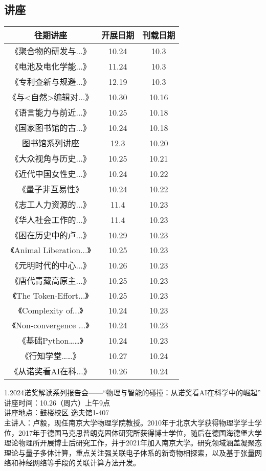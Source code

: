 \documentclass[letterpaper, 12pt]{article}
\begin{document}
\begin{multicols}{2}

\section{讲座}
\begin{tabular}{|c|c|c|}
    \hline
    往期讲座 & 开展日期 & 刊载日期\\
    \hline\hline
    《聚合物的研发与...》 & 10.24 & 10.3\\
    《电池及电化学能...》 & 11.24 & 10.3\\
    《专利查新与规避...》 & 12.19 & 10.3\\
    《与<自然>编辑对...》 & 10.30 & 10.16\\
    《语言能力与前近...》 & 10.25 & 10.18\\
    《国家图书馆的古...》 & 10.24 & 10.18\\
    图书馆系列讲座 & 12.3 & 10.20\\
    《大众视角与历史...》 & 10.25 & 10.21\\
    《近代中国女性史...》 & 10.24 & 10.22\\
    《量子非互易性》 & 10.24 & 10.22\\
    《志工人力资源的...》 & 11.4 & 10.23\\
    《华人社会工作的...》 & 11.4 & 10.23\\
    《困在历史中的卢...》 & 10.29 & 10.23\\
    《Animal Liberation...》 & 10.25 & 10.23\\
    《元明时代的中心...》 & 10.26 & 10.23\\
    《唐代青藏高原主...》 & 10.25 & 10.23\\
    《The Token-Effort...》 & 10.25 & 10.23\\
    《Complexity of...》 & 10.24 & 10.23\\
    《Non-convergence ...》 & 10.24 & 10.23\\
    《基础Python……》 & 10.24 & 10.23\\
    《行知学堂……》 & 10.27 & 10.24\\
    《从诺奖看AI在科...》 & 10.26 & 10.24\\

    
    \hline
\end{tabular}

1.2024诺奖解读系列报告会——“物理与智能的碰撞：从诺奖看AI在科学中的崛起”\\
讲座时间：10.26（周六）上午9点\\
讲座地点：鼓楼校区 逸夫馆1-407\\
主讲人：卢毅，现任南京大学物理学院教授。2010年于北京大学获得物理学学士学位，2017年于德国马克思普朗克固体研究所获得博士学位，随后在德国海德堡大学理论物理所开展博士后研究工作，并于2021年加入南京大学。研究领域涵盖凝聚态理论与量子多体计算，重点关注强关联电子体系的新奇物相探索，以及基于张量网络和神经网络等手段的关联计算方法开发。


\end{multicols}
\end{document}
